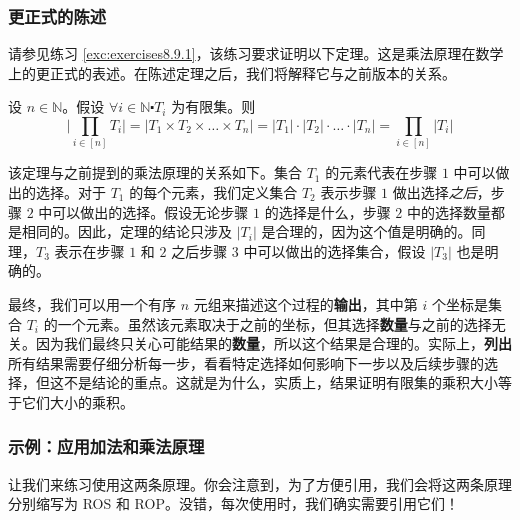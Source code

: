 \subsubsection*{更正式的陈述}

请参见练习 \ref{exc:exercises8.9.1}，该练习要求证明以下定理。这是乘法原理在数学上的更正式的表述。在陈述定理之后，我们将解释它与之前版本的关系。

\begin{theorem}\label{theorem8.2.10}
    设 $n \in \mathbb{N}$。假设 $\forall i \in \mathbb{N} \centerdot T_i$ 为有限集。则
    \[\Bigg|\prod_{i \in [n]} T_i \Bigg| = |T_1 \times T_2 \times \dots \times T_n| = |T_1| \cdot |T_2| \cdot \dots \cdot |T_n| = \prod_{i \in [n]} |T_i|\]
\end{theorem}

该定理与之前提到的乘法原理的关系如下。集合 $T_1$ 的元素代表在步骤 $1$ 中可以做出的选择。对于 $T_1$ 的每个元素，我们定义集合 $T_2$ 表示步骤 $1$ 做出选择\emph{之后}，步骤 $2$ 中可以做出的选择。假设无论步骤 $1$ 的选择是什么，步骤 $2$ 中的选择数量都是相同的。因此，定理的结论只涉及 $|T_i|$ 是合理的，因为这个值是明确的。同理，$T_3$ 表示在步骤 $1$ 和 $2$ 之后步骤 $3$ 中可以做出的选择集合，假设 $|T_3|$ 也是明确的。

最终，我们可以用一个有序 $n$ 元组来描述这个过程的\textbf{输出}，其中第 $i$ 个坐标是集合 $T_i$ 的一个元素。虽然该元素取决于之前的坐标，但其选择\textbf{数量}与之前的选择无关。因为我们最终只关心可能结果的\textbf{数量}，所以这个结果是合理的。实际上，\textbf{列出}所有结果需要仔细分析每一步，看看特定选择如何影响下一步以及后续步骤的选择，但这不是结论的重点。这就是为什么，实质上，结果证明有限集的乘积大小等于它们大小的乘积。

\subsubsection*{示例：应用加法和乘法原理}

让我们来练习使用这两条原理。你会注意到，为了方便引用，我们会将这两条原理分别缩写为 ROS 和 ROP。没错，每次使用时，我们确实需要引用它们！\\

